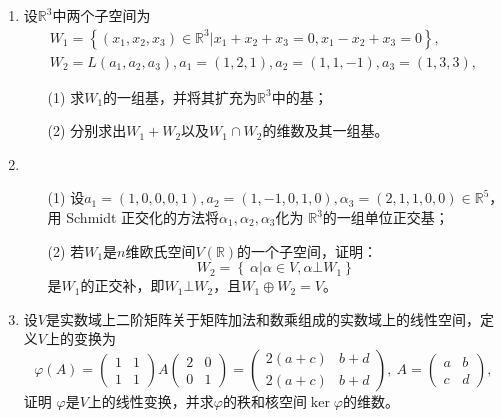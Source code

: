 \begin{enumerate}
    \item 设\(\mathbb{R}^3\)中两个子空间为
          \begin{align*}
              W_1 = \left\{ \left( x_1,x_2,x_3 \right) \in \mathbb{R}^3 | x_1 + x_2 + x_3 = 0,x_1 - x_2 + x_3 = 0 \right\}, \\
              W_2 = L\left( a_1,a_2,a_3 \right),a_1 = (1,2,1),a_2 = (1,1, - 1),a_3 = (1,3,3),
          \end{align*}
          \begin{enumerate}
              \item[(1)] 求\(W_1\)的一组基，并将其扩充为\(\mathbb{R}^3\)中的基；
              \item[(2)] 分别求出\(W_1 + W_2\)以及\(W_1 \cap W_2\)的维数及其一组基。
          \end{enumerate}

    \item
          \begin{enumerate}
              \item[(1)] 设\(a_1 = (1,0,0,0,1),a_2 = (1, - 1,0,1,0),\alpha_3 = (2,1,1,0,0) \in \mathbb{R}^{5}\)，用
                    Schmidt 正交化的方法将\(\alpha_1,\alpha_2,\alpha_3\)化为
                    \(\mathbb{R}^3\)的一组单位正交基；
              \item[(2)] 若\(W_1\)是\(n\)维欧氏空间\(V\left( \mathbb{R} \right)\)的一个子空间，证明：
                    \[W_2 = \left\{ \left. \ \alpha \right|\alpha \in V,\alpha\bot W_1 \right\}\]
                    是\(W_1\)的正交补，即\(W_1\bot W_2\)，且\(W_1 \oplus W_2 = V\)。
          \end{enumerate}

    \item 设\(V\)是实数域上二阶矩阵关于矩阵加法和数乘组成的实数域上的线性空间，定义\(V\)上的变换为
          \[\varphi(A) =
              \begin{pmatrix}
                  1 & 1 \\
                  1 & 1
              \end{pmatrix} A \begin{pmatrix}
                  2 & 0 \\
                  0 & 1
              \end{pmatrix} = \begin{pmatrix}
                  2(a + c) & b + d \\
                  2(a + c) & b + d
              \end{pmatrix},\ A = \begin{pmatrix}
                  a & b \\
                  c & d
              \end{pmatrix},\]
          证明 \(\varphi\)是\(V\)上的线性变换，并求\(\varphi\)的秩和核空间\(\ker\varphi\)的维数。



\end{enumerate}
